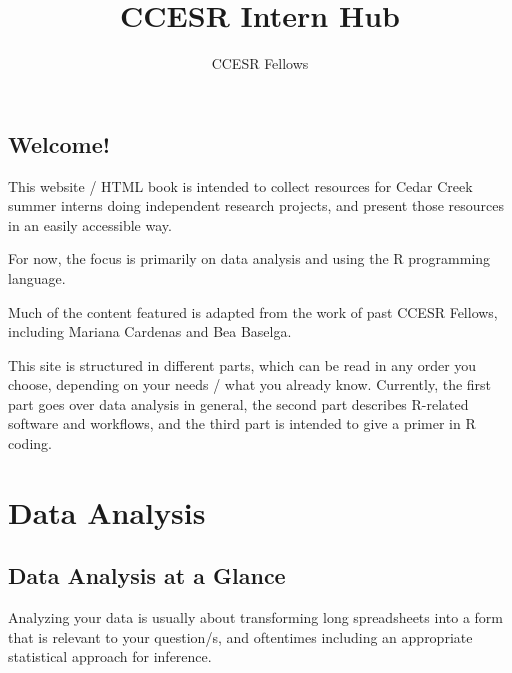 \documentclass[
  letterpaper,
  DIV=11,
  numbers=noendperiod]{scrreprt}
\title{CCESR Intern Hub}
\author{CCESR Fellows}
\date{}
\renewcommand*\contentsname{Table of contents}
\newcommand\contentsname{Table of contents}
\begin{document}
\maketitle
\ifdefined\Shaded\renewenvironment{Shaded}{\begin{tcolorbox}[interior hidden, boxrule=0pt, breakable, sharp corners, borderline west={3pt}{0pt}{shadecolor}, frame hidden, enhanced]}{\end{tcolorbox}}\fi

\renewcommand*\contentsname{Table of contents}
{
\hypersetup{linkcolor=}
\setcounter{tocdepth}{2}
\tableofcontents
}

\hypertarget{welcome}{%
\chapter*{Welcome!}\label{welcome}}


This website / HTML book is intended to collect resources for Cedar
Creek summer interns doing independent research projects, and present
those resources in an easily accessible way.

For now, the focus is primarily on data analysis and using the R
programming language.

Much of the content featured is adapted from the work of past CCESR
Fellows, including Mariana Cardenas and Bea Baselga.

This site is structured in different parts, which can be read in any
order you choose, depending on your needs / what you already know.
Currently, the first part goes over data analysis in general, the second
part describes R-related software and workflows, and the third part is
intended to give a primer in R coding.

\part{Data Analysis}

\hypertarget{data-analysis-at-a-glance}{%
\chapter{Data Analysis at a Glance}\label{data-analysis-at-a-glance}}

Analyzing your data is usually about transforming long spreadsheets into
a form that is relevant to your question/s, and oftentimes including an
appropriate statistical approach for inference.
\end{document}
